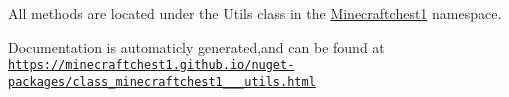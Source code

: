 All methods are located under the {\ttfamily Utils} class in the {\ttfamily \hyperlink{namespace_minecraftchest1}{Minecraftchest1}} namespace.

Documentation is automaticly generated,and can be found at \href{https://minecraftchest1.github.io/nuget-packages/class_minecraftchest1_1_1_utils.html}{\tt https\+://minecraftchest1.\+github.\+io/nuget-\/packages/class\+\_\+minecraftchest1\+\_\+\_\+\_\+utils.\+html} 